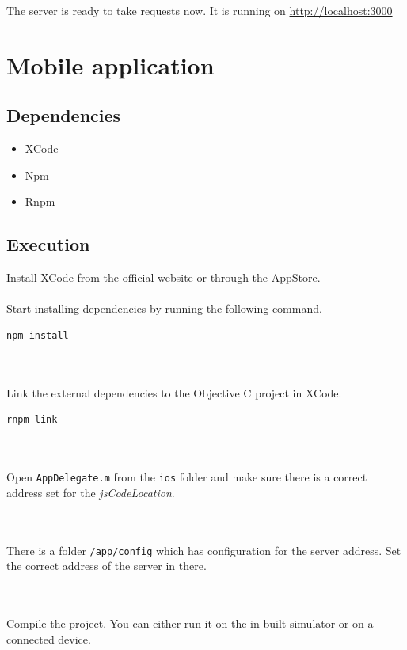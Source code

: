 \documentclass[thesis=M,english]{FITthesis}[2012/10/20]
\begin{document}
\noindent The server is ready to take requests now. It is running on \url{http://localhost:3000}


\section{Mobile application}

\subsection{Dependencies}
\begin{itemize}
  \item XCode
  \item Npm
  \item Rnpm
\end{itemize}
\subsection{Execution}

Install XCode from the official website or through the AppStore.
\\~\\
\noindent
Start installing dependencies by running the following command.
\begin{lstlisting}[language=C, style=nonumbers]
 npm install
\end{lstlisting} 

\\~\\
\noindent Link the external dependencies to the Objective C project in XCode.
\begin{lstlisting}[language=C, style=nonumbers]
 rnpm link
\end{lstlisting} 

\\~\\
\noindent Open \verb|AppDelegate.m| from the \verb|ios| folder and make sure there is a correct address set for the \textit{jsCodeLocation}.

\\~\\
\noindent There is a folder \verb|/app/config| which has configuration for the server address. Set the correct address of the server in there.

\\~\\
\noindent Compile the project. You can either run it on the in-built simulator or on a connected device.
\end{document}
